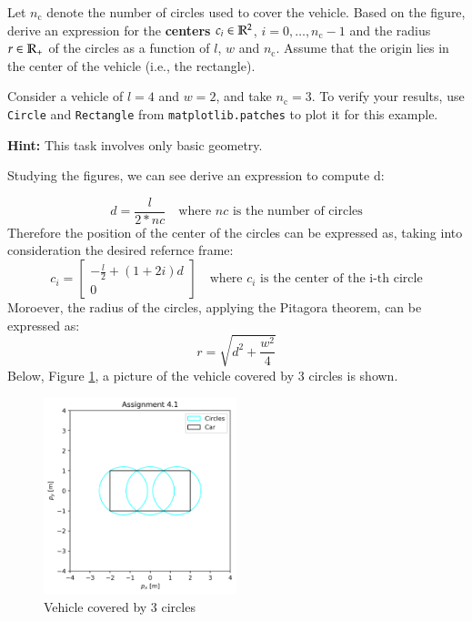 \documentclass[]{article}
\begin{document}
\newcommand{\nc}{n_{\mathrm{c}}}
\begin{assignment}
	Let $\nc$ denote the number of circles used to cover the vehicle. 
	Based on the figure, derive an expression 
	for the \textbf{centers} $c_i \in \mathbb{R}^2$, $i = 0, \dots, \nc-1$ 
	and the radius $r \in \mathbb{R}_+$ of the circles
	as a function of $l$, $w$ and $\nc$. 
	Assume that the origin lies in the center of the vehicle (i.e., the rectangle).
	
	Consider a vehicle of $l=4$ and $w=2$, and take $\nc=3$. 
	To verify your results, use \texttt{Circle} and \texttt{Rectangle} from \texttt{matplotlib.patches} 
	to plot it for this example.

	\textbf{Hint:} This task involves only basic geometry.
\end{assignment}
\begin{flushleft}
	Studying the figures, we can see derive an expression to compute d:
\end{flushleft}
\[
	d = \frac{l}{2 * nc} \quad \text{where } nc \text{ is the number of circles}
\]
Therefore the position of the center of the circles can be expressed as, taking into consideration the desired refernce frame:
\[
	c_i = \begin{bmatrix}
		- \frac{l}{2} + (1 + 2i)d \\
		0
	\end{bmatrix} \quad \text{where } c_i \text{ is the center of the i-th circle}
\]
Moroever, the radius of the circles, applying the Pitagora theorem, can be expressed as:
\[
	r = \sqrt{d^2 + \frac{w^2}{4}}
\]
Below, Figure \ref{fig:assignment4_1}, a picture of the vehicle covered by 3 circles is shown.
\begin{figure}[H]
    \centering
    \includegraphics[width=0.5\textwidth]{images/Assignment_41.png}
    \caption{Vehicle covered by 3 circles}
    \label{fig:assignment4_1}
\end{figure}
\end{document}
